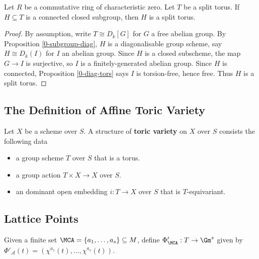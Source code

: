 \begin{proposition}
  \label{1-1-1-subgroup-torus}

  Let $R$ be a commutative ring of characteristic zero.
  Let $T$ be a split torus.
  If $H \subseteq T$ is a connected closed subgroup, then $H$ is a split torus.
\end{proposition}
\begin{proof}

  By assumption, write $T \cong D_k[G]$ for $G$ a free abelian group.
  By Proposition \ref{0-subgroup-diag}, $H$ is a diagonalisable group scheme,
  say $H \cong D_k(I)$ for $I$ an abelian group.
  Since $H$ is a closed subscheme, the map $G \to I$ is surjective,
  so $I$ is a finitely-generated abelian group.
  Since $H$ is connected, Proposition \ref{0-diag-tors} says $I$ is torsion-free, hence free.
  Thus $H$ is a split torus.
\end{proof}


\subsection{The Definition of Affine Toric Variety}


\begin{definition}
  \label{1-1-3-tor-var}
  \leanok
  Let $X$ be a scheme over $S$. A structure of {\bf toric variety} on $X$ over $S$ consists the following data
  \begin{itemize}
    \item a group scheme $T$ over $S$ that is a torus.
    \item a group action $T \times X \to X$ over $S$.
    \item an dominant open embedding $i : T \to X$ over $S$ that is $T$-equivariant.
  \end{itemize}
\end{definition}


\subsection{Lattice Points}

\begin{definition}
  \label{1-1-phiAprime}

  Given a finite set $\MCA = \{a_1, \dotsc, a_s\} \subseteq M$, define $\Phi'_\MCA : T \to \Gm^s$
  given by $\Phi'_{\mathcal A} (t) = (\chi^{a_1} (t), \dotsc, \chi^{a_s} (t))$.
\end{definition}

